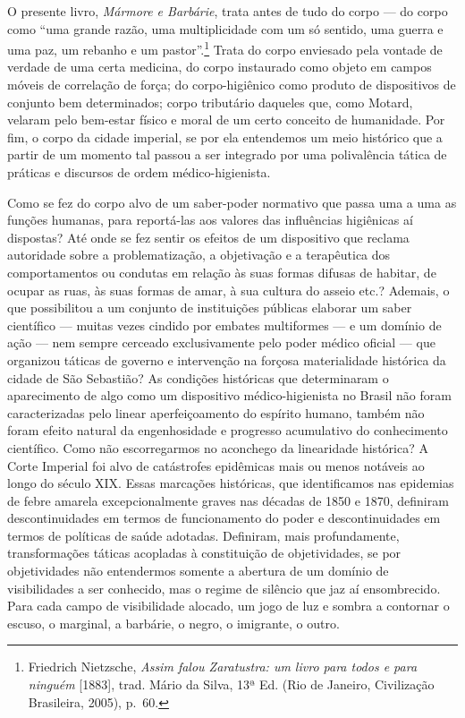 \asterisc

O presente livro, \textit{Mármore e Barbárie}, trata antes de tudo do
corpo --- do corpo como ``uma grande razão, uma multiplicidade com um só
sentido, uma guerra e uma paz, um rebanho e um pastor''.\footnote{Friedrich
  Nietzsche, \textit{Assim falou Zaratustra: um livro para todos e para
  ninguém} {[}1883{]}, trad. Mário da Silva, 13ª Ed. (Rio de Janeiro,
  Civilização Brasileira, 2005), p.~60.} Trata do corpo enviesado pela
vontade de verdade de uma certa medicina, do corpo instaurado como
objeto em campos móveis de correlação de força; do corpo-higiênico como
produto de dispositivos de conjunto bem determinados; corpo tributário
daqueles que, como Motard, velaram pelo bem-estar físico e moral de um
certo conceito de humanidade. Por fim, o corpo da cidade imperial, se
por ela entendemos um meio histórico que a partir de um momento tal
passou a ser integrado por uma polivalência tática de práticas e
discursos de ordem médico-higienista.

Como se fez do corpo alvo de um saber-poder normativo que passa uma a
uma as funções humanas, para reportá-las aos valores das influências
higiênicas aí dispostas? Até onde se fez sentir os efeitos de um
dispositivo que reclama autoridade sobre a problematização, a
objetivação e a terapêutica dos comportamentos ou condutas em relação às
suas formas difusas de habitar, de ocupar as ruas, às suas formas de
amar, à sua cultura do asseio etc.? Ademais, o que possibilitou a um
conjunto de instituições públicas elaborar um saber científico --- muitas
vezes cindido por embates multiformes --- e um domínio de ação --- nem
sempre cerceado exclusivamente pelo poder médico oficial --- que
organizou táticas de governo e intervenção na forçosa materialidade
histórica da cidade de São Sebastião? As condições históricas que
determinaram o aparecimento de algo como um dispositivo
médico-higienista no Brasil não foram caracterizadas pelo linear
aperfeiçoamento do espírito humano, também não foram efeito natural da
engenhosidade e progresso acumulativo do conhecimento científico. Como
não escorregarmos no aconchego da linearidade histórica? A Corte
Imperial foi alvo de catástrofes epidêmicas mais ou menos notáveis ao
longo do século XIX. Essas marcações históricas, que identificamos nas
epidemias de febre amarela excepcionalmente graves nas décadas de 1850 e
1870, definiram descontinuidades em termos de funcionamento do poder e
descontinuidades em termos de políticas de saúde adotadas. Definiram,
mais profundamente, transformações táticas acopladas à constituição de
objetividades, se por objetividades não entendermos somente a abertura
de um domínio de visibilidades a ser conhecido, mas o regime de silêncio
que jaz aí ensombrecido. Para cada campo de visibilidade alocado, um
jogo de luz e sombra a contornar o escuso, o marginal, a barbárie, o
negro, o imigrante, o outro.

